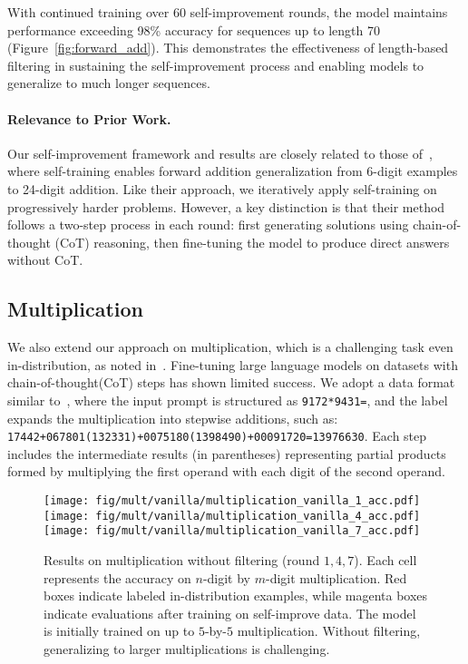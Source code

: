 With continued training over 60 self-improvement rounds, the model maintains performance exceeding 98\% accuracy for sequences up to length 70 (Figure~\ref{fig:forward_add}). This demonstrates the effectiveness of length-based filtering in sustaining the self-improvement process and enabling models to generalize to much longer sequences.


\paragraph{Relevance to Prior Work.} Our self-improvement framework and results are closely related to those of~\citet{zhang2023chain}, where self-training enables forward addition generalization from 6-digit examples to 24-digit addition. Like their approach, we iteratively apply self-training on progressively harder problems. However, a key distinction is that their method follows a two-step process in each round: first generating solutions using chain-of-thought (CoT) reasoning, then fine-tuning the model to produce direct answers without CoT.





\subsection{Multiplication}\label{sec:mult}
We also extend our approach on multiplication, which is a challenging task even in-distribution, as noted in~\citet{dziri2024faith}. Fine-tuning large language models on datasets with chain-of-thought(CoT) steps has shown limited success. We adopt a data format similar to~\citep{deng2024explicit}, where the input prompt is structured as \texttt{9172*9431=}, and the label expands the multiplication into stepwise additions, such as:
\texttt{17442+067801(132331)+0075180(1398490)+00091720=13976630}.
Each step includes the intermediate results (in parentheses) representing partial products formed by multiplying the first operand with each digit of the second operand. 

\begin{figure}
    \centering
    \texttt{[image: fig/mult/vanilla/multiplication\_vanilla\_1\_acc.pdf]}
    \texttt{[image: fig/mult/vanilla/multiplication\_vanilla\_4\_acc.pdf]}
    \texttt{[image: fig/mult/vanilla/multiplication\_vanilla\_7\_acc.pdf]}    
    \caption{Results on multiplication without filtering (round $1,4,7$). Each cell represents the accuracy on $n$-digit by $m$-digit multiplication. Red boxes indicate labeled in-distribution examples, while magenta boxes indicate evaluations after training on self-improve data. The model is initially trained on up to $5$-by-$5$ multiplication. Without filtering, generalizing to larger multiplications is challenging.}
    \label{fig:multiplication_vanilla}
    \vspace{-3mm}
\end{figure}


